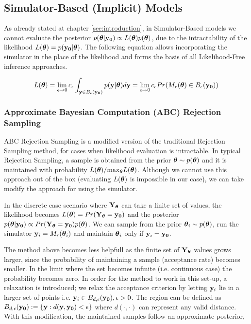 \subsection{Simulator-Based (Implicit) Models}

As already stated at chapter \ref{sec:introduction}, in
Simulator-Based models we cannot evaluate the posterior
$p(\boldsymbol{\theta}|\mathbf{y_0}) \propto L(\boldsymbol{\theta})p(\boldsymbol{\theta})$, due to the
intractability of the likelihood $L(\boldsymbol{\theta}) = p(\mathbf{y_0}|\boldsymbol{\theta})$. The
following equation allows incorporating the simulator in the place of
the likelihood and forms the basis of all Likelihood-Free inference
approaches.

\begin{equation} \label{eq:likelihood} L(\boldsymbol{\theta}) = \lim_{\epsilon \to
    0} c_\epsilon \int_{\mathbf{y} \in B_\epsilon(\mathbf{y_0})} p(\mathbf{y}|\boldsymbol{\theta})d\mathbf{y}
  = \lim_{\epsilon \to 0} c_\epsilon Pr(M_r(\boldsymbol{\theta}) \in
  B_\epsilon(\mathbf{y_0}))
\end{equation}

\subsubsection{Approximate Bayesian Computation (ABC) Rejection
  Sampling}

ABC Rejection Sampling is a modified version of the traditional
Rejection Sampling method, for cases when likelihood evaluation is
intractable. In typical Rejection Sampling, a sample is obtained from
the prior $\boldsymbol{\theta} \sim p(\boldsymbol{\theta})$ and it is maintained with
probability $L(\boldsymbol{\theta})/ \text{max}_{\boldsymbol{\theta}} L(\boldsymbol{\theta})$. Although we
cannot use this approach out of the box (evaluating $L(\boldsymbol{\theta})$ is
impossible in our case), we can take modify the approach for using the
simulator.

In the discrete case scenario where $\mathbf{Y}_{\boldsymbol{\theta}}$ can take a finite
set of values, the likelihood becomes
$L(\boldsymbol{\theta}) = Pr(\mathbf{Y}_{\boldsymbol{\theta}} = \mathbf{y_0})$ and the posterior
$p(\boldsymbol{\theta}|\mathbf{y_0}) \propto Pr(\mathbf{Y}_{\boldsymbol{\theta}}=\mathbf{y_0})p(\boldsymbol{\theta})$. We can
sample from the prior $\boldsymbol{\theta}_i \sim p(\boldsymbol{\theta})$, run the simulator
$\mathbf{y}_i = M_r(\boldsymbol{\theta}_i)$ and maintain $\boldsymbol{\theta}_i$ only if
$\mathbf{y}_i = \mathbf{y_0}$.

The method above becomes less helpfull as the finite set of
$\mathbf{Y}_{\boldsymbol{\theta}}$ values grows larger, since the probability of
maintaining a sample (acceptance rate) becomes smaller. In the limit
where the set becomes infinite (i.e. continuous case) the probability
becomes zero. In order for the method to work in this set-up, a
relaxation is introduced; we relax the acceptance criterion by letting
$\mathbf{y}_{i}$ lie in a larger set of points i.e.
$\mathbf{y}_{i} \in B_{d,\epsilon}(\mathbf{y_0}), \epsilon > 0$. The region can be
defined as $B_{d,\epsilon} (\mathbf{y_0}) := \{\mathbf{y}: d(\mathbf{y}, \mathbf{y_0}) < \epsilon \}$
where $d(\cdot, \cdot)$ can represent any valid distance. With this
modification, the maintained samples follow an approximate posterior,

